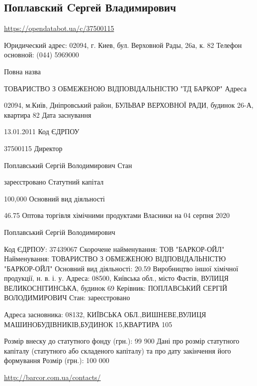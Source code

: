  
 

\subsection{Поплавский Cергей Владимирович}
\url{https://opendatabot.ua/c/37500115}

Юридический адрес:	02094, г. Киев, бул. Верховной Рады, 26а, к. 82
Телефон основной:	(044) 5969000

Повна назва

ТОВАРИСТВО З ОБМЕЖЕНОЮ ВІДПОВІДАЛЬНІСТЮ "ТД БАРКОР"
Адреса

02094, м.Київ, Дніпровський район, БУЛЬВАР ВЕРХОВНОЇ РАДИ, будинок 26-А, квартира 82
Дата заснування

13.01.2011
Код ЄДРПОУ

37500115
Директор

Поплавський Сергій Володимирович
Стан

зареєстровано
Статутний капітал

100,000
Основний вид діяльності

46.75 Оптова торгівля хімічними продуктами
Власники на 04 серпня 2020

Поплавський Сергій Володимирович

Код ЄДРПОУ: 37439067
Скорочене найменування: ТОВ "БАРКОР-ОЙЛ"
Найменування: ТОВАРИСТВО З ОБМЕЖЕНОЮ ВІДПОВІДАЛЬНІСТЮ "БАРКОР-ОЙЛ"
Основний вид діяльності: 20.59 Виробництво іншої хімічної продукції, н. в. і. у.
Адреса: 08500, Київська обл., місто Фастів, ВУЛИЦЯ ВЕЛИКОСНІТИНСЬКА, будинок 69
Керівник: ПОПЛАВСЬКИЙ СЕРГІЙ ВОЛОДИМИРОВИЧ
Стан: зареєстровано

Адреса засновника: 08132, КИЇВСЬКА ОБЛ.,ВИШНЕВЕ,ВУЛИЦЯ МАШИНОБУДІВНИКІВ,БУДИНОК 15,КВАРТИРА 105

Розмір внеску до статутного фонду (грн.): 99 900
Дані про розмір статутного капіталу (статутного або складеного капіталу) та про дату закінчення його формування
Розмір (грн.): 100 000 

\url{http://barcor.com.ua/contacts/}

